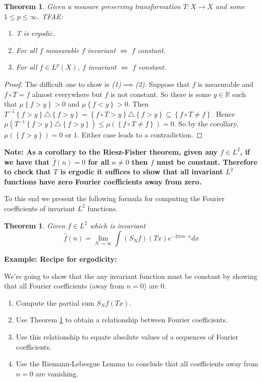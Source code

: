 \documentclass[11pt]{article}
\newcommand{\symd}{\triangle}
\newcommand{\R}{\mathbb{R}}
\newenvironment{note}
	{\begin{mdframed}[backgroundcolor=white, linecolor=red, roundcorner=5pt, linewidth=1pt]\bfseries{Note:}\normalfont}
	{\end{mdframed}}
\newenvironment{eg}
	{\begin{mdframed}[backgroundcolor=mylg,roundcorner=5pt,linewidth=0pt]\bfseries{Example:}\normalfont}
	{\end{mdframed}}
\newtheorem{theorem}[prop]{Theorem}
\begin{document}
\begin{theorem}
Given a measure preserving transformation $T:X\to X$ and some $1\leq p\leq\infty$. TFAE:
\begin{enumerate}
	\item T is ergodic.
	\item For all $f$ measurable $f$ invariant $\iff$ $f$ constant.
	\item For all $f\in L^p(X)$, $f$ invariant $\iff$ $f$ constant.
\end{enumerate}
\end{theorem}

\begin{proof}
The difficult one to show is \textit{(1)}$\implies$\textit{(2)}.
Suppose that $f$ is measurable and $f\circ T = f$ almost everywhere but $f$ is not constant.
So there is some $y\in \R$ such that $\mu\left\{ f > y\right\}>0$ and $\mu\left\{ f < y\right\}>0$.
Then $T^{-1}\left\{ f > y \right\}\symd \left\{ f > y\right\} = \left\{ f \circ T > y\right\} \symd \left\{ f > y \right\} \subseteq \left\{ f\circ T \neq f\right\}$.
Hence $\mu(T^{-1}\left\{ f > y\right\} \symd \left\{ f>y\right\}) \leq \mu(\left\{ f \circ T \neq f\right\}) = 0$.
So by the corollary, $\mu(\left\{ f > y\right\}) = 0$ or $1$.
Either case leads to a contradiction.
\end{proof}

\begin{note}
	As a corollary to the Riesz-Fisher theorem, given any $f\in L^2$, if we have that $\hat{f}(n)=0$ for all $n\neq 0$ then $f$ must be constant.
Therefore to check that $T$ is ergodic it suffices to show that all invariant $L^2$ functions have zero Fourier coefficients away from zero.
\end{note}
To this end we present the following formula for computing the Fourier coefficients of invariant $L^2$ functions.
\begin{theorem}
\label{th:coeffcompute}
Given $f\in L^2$ which is invariant
$$\hat{f}(n)=\lim_{N\to\infty}\int (S_Nf)(Tx)e^{-2\pi i n\cdot x}dx$$
\end{theorem}

\begin{eg}
	\textbf{Recipe for ergodicity:}

	We're going to show that the any invariant function must be constant by showing that all Fourier coefficients (away from $n=0$) are $0$.

	\begin{enumerate}
		\item Compute the partial sum $S_Nf(Tx)$.
		\item Use Theorem \ref{th:coeffcompute} to obtain a relationship between Fourier coefficients.
		\item Use this relationship to equate absolute values of a sequences of Fourier coefficients.
		\item Use the Riemann-Lebesgue Lemma to conclude that all coefficients away from $n=0$ are vanishing.
	\end{enumerate}
\end{eg}
\end{document}
